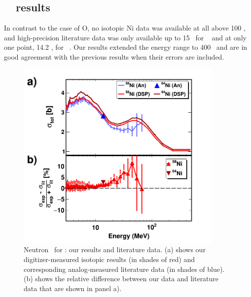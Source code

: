 \subsection{\niEightFour\ \tot\ results}
In contrast to the case of O, no isotopic Ni data was available at all above 100
\mega\electronvolt, and high-precision literature data was only available up to 15 \mega\electronvolt\ for
\niEight\ \cite{Perey1993} and at only one point, 14.2 \mega\electronvolt, for \niFour\
\cite{Dukarevich1967}. Our results extended the energy range to 400 \mega\electronvolt\ and are
in good agreement with the previous results when their errors are included.
\begin{figure}[tb]
    \centering
    \includegraphics[width=0.9\textwidth]{figures/TwoPanelNi.png}
    \caption[Neutron \tot\ for \niEightFour: our results and literature data]
    {
        Neutron \tot\ for \niEightFour: our results and literature data.
        (a) shows our digitizer-measured isotopic results (in shades of red) and
        corresponding analog-measured literature data \cite{Perey1993,
        Dukarevich1967} (in shades of blue). (b) shows the relative difference
        between our data and literature data that are shown in panel a).
    }
    \label{TwoPanelNi}
\end{figure}

